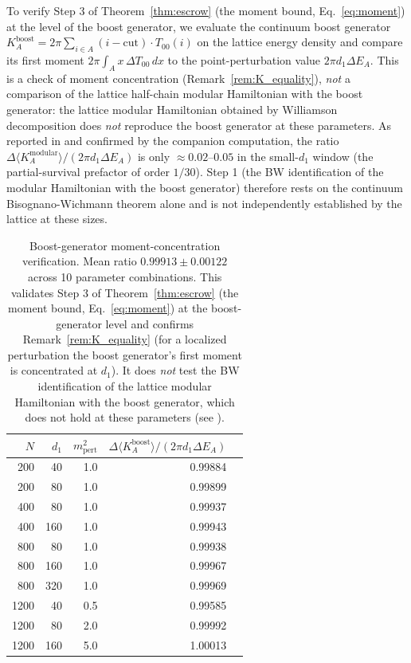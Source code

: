 \documentclass[11pt]{article}
\begin{document}
To verify Step 3 of Theorem~\ref{thm:escrow} (the moment bound, Eq.~\ref{eq:moment}) at the level of the boost generator, we evaluate the continuum boost generator $K^{\mathrm{boost}}_A = 2\pi \sum_{i \in A} (i - \mathrm{cut}) \cdot T_{00}(i)$ on the lattice energy density and compare its first moment $2\pi \int_A x\, \Delta T_{00}\, dx$ to the point-perturbation value $2\pi d_1 \Delta E_A$. This is a check of moment concentration (Remark~\ref{rem:K_equality}), \emph{not} a comparison of the lattice half-chain modular Hamiltonian with the boost generator: the lattice modular Hamiltonian obtained by Williamson decomposition does \emph{not} reproduce the boost generator at these parameters. As reported in \cite{Whitmer2026Lattice} and confirmed by the companion computation, the ratio $\Delta\langle K^{\mathrm{modular}}_A\rangle/(2\pi d_1 \Delta E_A)$ is only $\approx 0.02$--$0.05$ in the small-$d_1$ window (the partial-survival prefactor of order $1/30$). Step 1 (the BW identification of the modular Hamiltonian with the boost generator) therefore rests on the continuum Bisognano-Wichmann theorem alone and is not independently established by the lattice at these sizes.

\begin{table}[h]
\centering
\begin{tabular}{rrrrr}
\toprule
$N$ & $d_1$ & $m_{\mathrm{pert}}^2$ & $\Delta\langle K^{\mathrm{boost}}_A\rangle / (2\pi d_1 \Delta E_A)$ \\
\midrule
200 & 40 & 1.0 & 0.99884 \\
200 & 80 & 1.0 & 0.99899 \\
400 & 80 & 1.0 & 0.99937 \\
400 & 160 & 1.0 & 0.99943 \\
800 & 80 & 1.0 & 0.99938 \\
800 & 160 & 1.0 & 0.99967 \\
800 & 320 & 1.0 & 0.99969 \\
1200 & 40 & 0.5 & 0.99585 \\
1200 & 80 & 2.0 & 0.99992 \\
1200 & 160 & 5.0 & 1.00013 \\
\bottomrule
\end{tabular}
\caption{Boost-generator moment-concentration verification. Mean ratio $0.99913 \pm 0.00122$ across 10 parameter combinations. This validates Step 3 of Theorem~\ref{thm:escrow} (the moment bound, Eq.~\ref{eq:moment}) at the boost-generator level and confirms Remark~\ref{rem:K_equality} (for a localized perturbation the boost generator's first moment is concentrated at $d_1$). It does \emph{not} test the BW identification of the lattice modular Hamiltonian with the boost generator, which does not hold at these parameters (see \cite{Whitmer2026Lattice}).}
\label{tab:boost}
\end{table}
\end{document}
